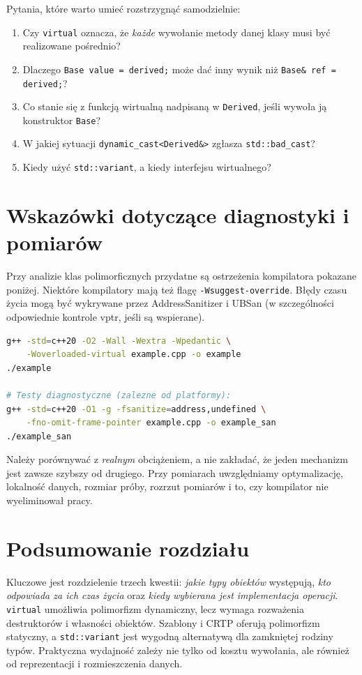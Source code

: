 \noindent Pytania, które warto umieć rozstrzygnąć samodzielnie:
\begin{enumerate}
\item Czy \texttt{virtual} oznacza, że \emph{każde} wywołanie metody
  danej klasy musi być realizowane pośrednio?
\item Dlaczego \texttt{Base value = derived;} może dać inny wynik
  niż \texttt{Base\& ref = derived;}?
\item Co stanie się z funkcją wirtualną nadpisaną w \texttt{Derived},
  jeśli wywoła ją konstruktor \texttt{Base}?
\item W jakiej sytuacji \texttt{dynamic\_cast<Derived\&>} zgłasza
  \texttt{std::bad\_cast}?
\item Kiedy użyć \texttt{std::variant}, a kiedy interfejsu wirtualnego?
\end{enumerate}

\section{Wskazówki dotyczące diagnostyki i pomiarów}

Przy analizie klas polimorficznych przydatne są ostrzeżenia
kompilatora pokazane poniżej. Niektóre kompilatory mają też flagę
\texttt{-Wsuggest-override}. Błędy czasu życia
mogą być wykrywane przez AddressSanitizer i UBSan (w szczególności
odpowiednie kontrole vptr, jeśli są wspierane).

\begin{lstlisting}[language=bash,caption={Kompilacja przykładowego programu w GCC lub Clangu.}]
g++ -std=c++20 -O2 -Wall -Wextra -Wpedantic \
    -Woverloaded-virtual example.cpp -o example
./example

# Testy diagnostyczne (zalezne od platformy):
g++ -std=c++20 -O1 -g -fsanitize=address,undefined \
    -fno-omit-frame-pointer example.cpp -o example_san
./example_san
\end{lstlisting}

Należy porównywać z \emph{realnym} obciążeniem, a nie zakładać,
że jeden mechanizm jest zawsze szybszy od drugiego. Przy pomiarach
uwzględniamy optymalizację, lokalność danych, rozmiar próby,
rozrzut pomiarów i to, czy kompilator nie wyeliminował pracy.

\section{Podsumowanie rozdziału}

Kluczowe jest rozdzielenie trzech kwestii: \emph{jakie typy obiektów}
występują, \emph{kto odpowiada za ich czas życia} oraz
\emph{kiedy wybierana jest implementacja operacji}.
\texttt{virtual} umożliwia polimorfizm dynamiczny, lecz wymaga
rozważenia destruktorów i własności obiektów. Szablony i CRTP
oferują polimorfizm statyczny, a \texttt{std::variant} jest
wygodną alternatywą dla zamkniętej rodziny typów.
Praktyczna wydajność zależy nie tylko od kosztu wywołania,
ale również od reprezentacji i rozmieszczenia danych.


